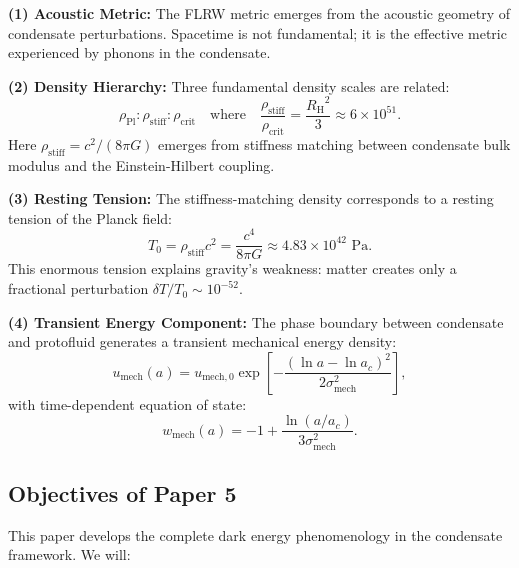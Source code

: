 \documentclass[11pt,a4paper]{article}
\newcommand{\rhocrit}{\ensuremath{\rho_{\mathrm{crit}}}}
\newcommand{\rhostiff}{\ensuremath{\rho_{\mathrm{stiff}}}}
\newcommand{\rhoPl}{\ensuremath{\rho_{\mathrm{Pl}}}}
\newcommand{\Tzero}{\ensuremath{T_0}}
\newcommand{\RH}{\ensuremath{R_{\mathrm{H}}}}
\newcommand{\umech}{\ensuremath{u_{\mathrm{mech}}}}
\newcommand{\wmech}{\ensuremath{w_{\mathrm{mech}}}}
\theoremstyle{definition}
\theoremstyle{remark}
\begin{document}
\textbf{(1) Acoustic Metric:} The FLRW metric emerges from the acoustic geometry of condensate perturbations. Spacetime is not fundamental; it is the effective metric experienced by phonons in the condensate.

\textbf{(2) Density Hierarchy:} Three fundamental density scales are related:
\begin{equation}
\rhoPl : \rhostiff : \rhocrit \quad \text{where} \quad \frac{\rhostiff}{\rhocrit} = \frac{\RH^2}{3} \approx 6 \times 10^{51}.
\end{equation}
Here $\rhostiff = c^2/(8\pi G)$ emerges from stiffness matching between condensate bulk modulus and the Einstein-Hilbert coupling.

\textbf{(3) Resting Tension:} The stiffness-matching density corresponds to a resting tension of the Planck field:
\begin{equation}
\Tzero = \rhostiff c^2 = \frac{c^4}{8\pi G} \approx 4.83 \times 10^{42} \text{ Pa}.
\end{equation}
This enormous tension explains gravity's weakness: matter creates only a fractional perturbation $\delta T/\Tzero \sim 10^{-52}$.

\textbf{(4) Transient Energy Component:} The phase boundary between condensate and protofluid generates a transient mechanical energy density:
\begin{equation}
\umech(a) = u_{\mathrm{mech},0} \exp\left[-\frac{(\ln a - \ln a_c)^2}{2\sigma_{\mathrm{mech}}^2}\right],
\end{equation}
with time-dependent equation of state:
\begin{equation}
\wmech(a) = -1 + \frac{\ln(a/a_c)}{3\sigma_{\mathrm{mech}}^2}.
\end{equation}

\subsection{Objectives of Paper 5}
\label{sec:objectives}

This paper develops the complete dark energy phenomenology in the condensate framework. We will:
\end{document}
